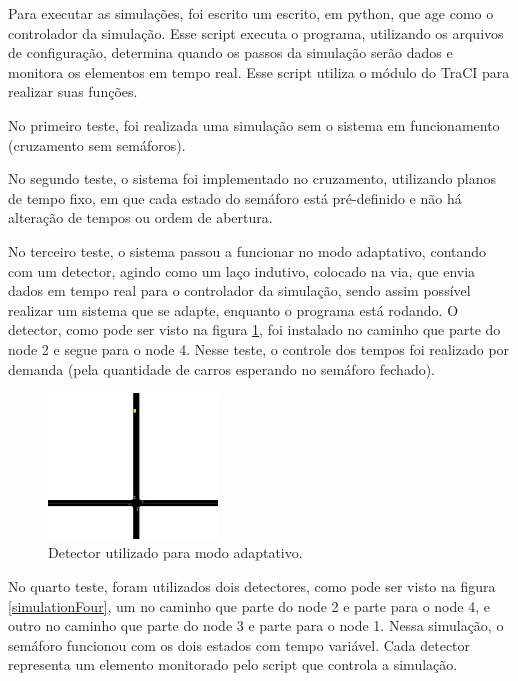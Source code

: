 Para executar as simulações, foi escrito um escrito, em python, que age como o controlador da simulação. Esse script executa o programa, utilizando os arquivos de configuração, determina quando os passos da simulação serão dados e monitora os elementos em tempo real. Esse script utiliza o módulo do TraCI para realizar suas funções.

No primeiro teste, foi realizada uma simulação sem o sistema em funcionamento (cruzamento sem semáforos).

No segundo teste, o sistema foi implementado no cruzamento, utilizando planos de tempo fixo, em que cada estado do semáforo está pré-definido e não há alteração de tempos ou ordem de abertura.

No terceiro teste, o sistema passou a funcionar no modo adaptativo, contando com um detector, agindo como um laço indutivo, colocado na via, que envia dados em tempo real para o controlador da simulação, sendo assim possível realizar um sistema que se adapte, enquanto o programa está rodando. O detector, como pode ser visto na figura \ref{simulationThree}, foi instalado no caminho que parte do node 2 e segue para o node 4.
Nesse teste, o controle dos tempos foi realizado por demanda (pela quantidade de carros esperando no semáforo fechado).

\begin{figure}[ht]
    \begin{center}
    \includegraphics[width=0.4\textwidth]{figuras/Simulation_3_Zoom.PNG}
    \end{center}
    \caption[Simulação com um detector veicular]{Detector utilizado para modo adaptativo.}
    \label{simulationThree}
\end{figure}

No quarto teste, foram utilizados dois detectores, como pode ser visto na figura \ref{simulationFour}, um no caminho que parte do node 2 e parte para o node 4, e outro no caminho que parte do node 3 e parte para o node 1. Nessa simulação, o semáforo funcionou com os dois estados com tempo variável. Cada detector representa um elemento monitorado pelo script que controla a simulação. 

